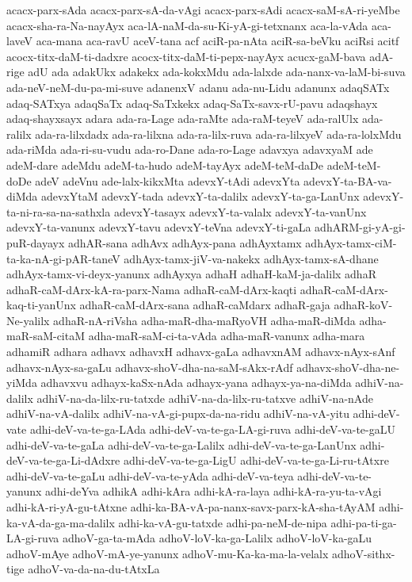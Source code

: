 {acacx-parx-sAda
acacx-parx-sA-da-vAgi
acacx-parx-sAdi
acacx-saM-sA-ri-yeMbe
acacx-sha-ra-Na-nayAyx
aca-lA-naM-da-su-Ki-yA-gi-tetxnanx
aca-la-vAda
aca-laveV
aca-mana
aca-ravU
aceV-tana
acf
aciR-pa-nAta
aciR-sa-beVku
aciRsi
acitf
acocx-titx-daM-ti-dadxre
acocx-titx-daM-ti-pepx-nayAyx
acucx-gaM-bava
adA-rige
adU
ada
adakUkx
adakekx
ada-kokxMdu
ada-lalxde
ada-nanx-va-laM-bi-suva
ada-neV-neM-du-pa-mi-suve
adanenxV
adanu
ada-nu-Lidu
adanunx
adaqSATx
adaq-SATxya
adaqSaTx
adaq-SaTxkekx
adaq-SaTx-savx-rU-pavu
adaqshayx
adaq-shayxsayx
adara
ada-ra-Lage
ada-raMte
ada-raM-teyeV
ada-ralUlx
ada-ralilx
ada-ra-lilxdadx
ada-ra-lilxna
ada-ra-lilx-ruva
ada-ra-lilxyeV
ada-ra-lolxMdu
ada-riMda
ada-ri-su-vudu
ada-ro-Dane
ada-ro-Lage
adavxya
adavxyaM
ade
adeM-dare
adeMdu
adeM-ta-hudo
adeM-tayAyx
adeM-teM-daDe
adeM-teM-doDe
adeV
adeVnu
ade-lalx-kikxMta
adevxY-tAdi
adevxYta
adevxY-ta-BA-va-diMda
adevxYtaM
adevxY-tada
adevxY-ta-dalilx
adevxY-ta-ga-LanUnx
adevxY-ta-ni-ra-sa-na-sathxla
adevxY-tasayx
adevxY-ta-valalx
adevxY-ta-vanUnx
adevxY-ta-vanunx
adevxY-tavu
adevxY-teVna
adevxY-ti-gaLa
adhARM-gi-yA-gi-puR-dayayx
adhAR-sana
adhAvx
adhAyx-pana
adhAyxtamx
adhAyx-tamx-ciM-ta-ka-nA-gi-pAR-taneV
adhAyx-tamx-jiV-va-nakekx
adhAyx-tamx-sA-dhane
adhAyx-tamx-vi-deyx-yanunx
adhAyxya
adhaH
adhaH-kaM-ja-dalilx
adhaR
adhaR-caM-dArx-kA-ra-parx-Nama
adhaR-caM-dArx-kaqti
adhaR-caM-dArx-kaq-ti-yanUnx
adhaR-caM-dArx-sana
adhaR-caMdarx
adhaR-gaja
adhaR-koV-Ne-yalilx
adhaR-nA-riVsha
adha-maR-dha-maRyoVH
adha-maR-diMda
adha-maR-saM-citaM
adha-maR-saM-ci-ta-vAda
adha-maR-vanunx
adha-mara
adhamiR
adhara
adhavx
adhavxH
adhavx-gaLa
adhavxnAM
adhavx-nAyx-sAnf
adhavx-nAyx-sa-gaLu
adhavx-shoV-dha-na-saM-sAkx-rAdf
adhavx-shoV-dha-ne-yiMda
adhavxvu
adhayx-kaSx-nAda
adhayx-yana
adhayx-ya-na-diMda
adhiV-na-dalilx
adhiV-na-da-lilx-ru-tatxde
adhiV-na-da-lilx-ru-tatxve
adhiV-na-nAde
adhiV-na-vA-dalilx
adhiV-na-vA-gi-pupx-da-na-ridu
adhiV-na-vA-yitu
adhi-deV-vate
adhi-deV-va-te-ga-LAda
adhi-deV-va-te-ga-LA-gi-ruva
adhi-deV-va-te-gaLU
adhi-deV-va-te-gaLa
adhi-deV-va-te-ga-Lalilx
adhi-deV-va-te-ga-LanUnx
adhi-deV-va-te-ga-Li-dAdxre
adhi-deV-va-te-ga-LigU
adhi-deV-va-te-ga-Li-ru-tAtxre
adhi-deV-va-te-gaLu
adhi-deV-va-te-yAda
adhi-deV-va-teya
adhi-deV-va-te-yanunx
adhi-deYva
adhikA
adhi-kAra
adhi-kA-ra-laya
adhi-kA-ra-yu-ta-vAgi
adhi-kA-ri-yA-gu-tAtxne
adhi-ka-BA-vA-pa-nanx-savx-parx-kA-sha-tAyAM
adhi-ka-vA-da-ga-ma-dalilx
adhi-ka-vA-gu-tatxde
adhi-pa-neM-de-nipa
adhi-pa-ti-ga-LA-gi-ruva
adhoV-ga-ta-mAda
adhoV-loV-ka-ga-Lalilx
adhoV-loV-ka-gaLu
adhoV-mAye
adhoV-mA-ye-yanunx
adhoV-mu-Ka-ka-ma-la-velalx
adhoV-sithx-tige
adhoV-va-da-na-du-tAtxLa
}
